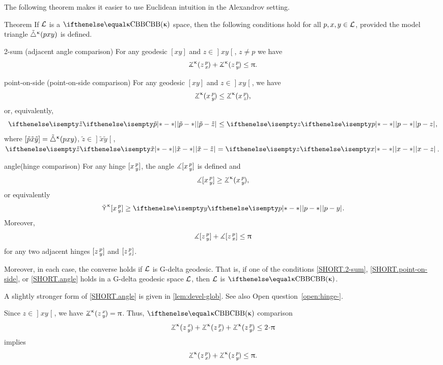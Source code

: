 The following theorem makes it easier to use Euclidean intuition in the Alexandrov 
setting.
\begin{thm}{Theorem}
\label{thm:defs_of_alex} 
If $\mathcal{L}$ is a $\Alex\kappa$ space, 
then the following conditions hold for all $p,x,y\in \spc{L}$, provided the model triangle ${\tilde\triangle}^{\upkappa}(p x y)$ is defined.

\begin{subthm}{2-sum} 
(adjacent angle comparison) For any geodesic $[x y]$ and $z\in \mathopen{]}x y\mathclose{[}$, $z\ne p$ we have
\[\angk\kappa z p x
+\angk\kappa z p y\le \pi.\]
\end{subthm}

\begin{subthm}{point-on-side}
(point-on-side comparison)
For any geodesic $[x y]$ and $z\in \mathopen{]}x y\mathclose{[}$, we have
\[\angk\kappa x p y\le\angk\kappa x p z,\]
or, equivalently, 
\[\dist{\tilde p}{\tilde z}{}\le \dist{p}{z}{},\]
where $[{\tilde p}{\tilde x}{\tilde y}]={\tilde\triangle}^{\upkappa}(p x y)$, $\tilde z\in\mathopen{]} \tilde x\tilde y\mathclose{[}$, $\dist{\tilde x}{\tilde z}{}=\dist{x}{z}{}$.
\end{subthm}

\begin{subthm}{angle}(hinge comparison)
For any hinge $[x\,{}^{p}_{y}]$, the angle 
$\measuredangle[x\,{}^{p}_{y}]$ is defined and 
\[\mangle\hinge x p y\ge\angk\kappa x p y,\]
or equivalently
\[\side\kappa \hinge x p y\ge\dist{p}{y}{}.\]
Moreover, 
\[\mangle\hinge z p y + \mangle\hinge z p x\le\pi\]
for any two adjacent hinges $[z\,{}^{p}_{y}]$ and $[z\,{}^{p}_{x}]$.
\end{subthm}

Moreover, in each case, the converse holds if $\mathcal{L}$ is G-delta geodesic.
That is, if one of the conditions \ref{SHORT.2-sum}, \ref{SHORT.point-on-side}, or  \ref{SHORT.angle} holds in a  G-delta geodesic space $\mathcal{L}$, then $\mathcal{L}$ is $\Alex\kappa$.
\end{thm}

A slightly stronger form of \ref{SHORT.angle} is given in \ref{lem:devel-glob}.
See also Open question~\ref{open:hinge-}.

Since $z\in \mathopen{]}x y\mathclose{[}$, we have $\angk\kappa z x y=\pi$. 
Thus, $\Alex\kappa$ comparison
\[\angk\kappa z x y
+\angk\kappa z p x
+\angk\kappa z p y\le2\cdot\pi\]
implies
\[\angk\kappa z p x
+\angk\kappa z p y
\le\pi.\]

